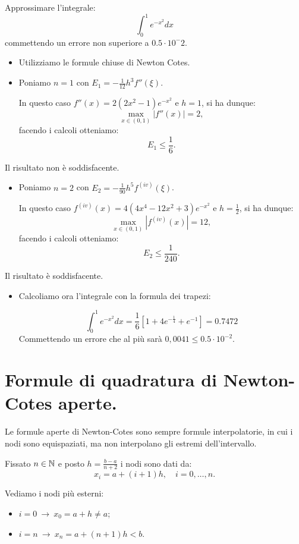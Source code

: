 \begin{ese}
Approssimare l'integrale:
\[
\int_0^1 e^{-x^2}dx
\]
commettendo un errore non superiore a $0.5 \cdot 10^-2$.
\end{ese}
\begin{svol}
\begin{itemize}
\item Utilizziamo le formule chiuse di Newton Cotes.
\item Poniamo $n = 1$ con $E_1 = -\frac{1}{12}h^3f''(\xi)$.

In questo caso $f''(x) = 2(2x^2 -1)e^{-x^2}$ e $h = 1$, si ha 
dunque: \[\max_{x \in (0,1)}|f''(x)|=2, \]
facendo i calcoli otteniamo:\[E_1 \leq \frac{1}{6}.\]
\end{itemize}
Il risultato non è soddisfacente.
\begin{itemize}
\item Poniamo $n = 2$ con $E_2 = -\frac{1}{90}h^5f^{(iv)}(\xi)$.

In questo caso $f^{(iv)}(x) = 4(4x^4 -12x^2+3)e^{-x^2}$ e $h = \frac{1}{2}$, si ha 
dunque: \[\max_{x \in (0,1)}|f^{(iv)}(x)|=12, \]
facendo i calcoli otteniamo:\[E_2 \leq \frac{1}{240}.\]
\end{itemize}
Il risultato è soddisfacente.
\begin{itemize}
\item Calcoliamo ora l'integrale con la formula dei trapezi:

\[\int_0^1 e^{-x^2}dx = \frac{1}{6}\left[1 + 4e^{-\frac{1}{4}}+ e^{-1}\right]
= 0.7472\]
Commettendo un errore che al più sarà $0,0041 \leq 0.5\cdot 10^{-2}$.
\end{itemize}
\end{svol}

\section{Formule di quadratura di Newton-Cotes aperte.}
Le formule aperte di Newton-Cotes sono sempre formule interpolatorie, in cui
i nodi sono equispaziati, ma non interpolano gli estremi dell'intervallo.

Fissato $n \in \mathbb{N}$ e posto $h = \frac{b-a}{n+2}$ i nodi sono dati da:
\[x_i = a + (i+1)h, \quad i = 0,\ldots,n.\]
\begin{osse} Vediamo i nodi più esterni: 

\begin{itemize}
\item[]$i = 0\ \longrightarrow\ x_0 = a + h \neq a$;
\item[]$i = n\ \longrightarrow\ x_n = a+ (n+1)h < b$.
\end{itemize}
\end{osse}

